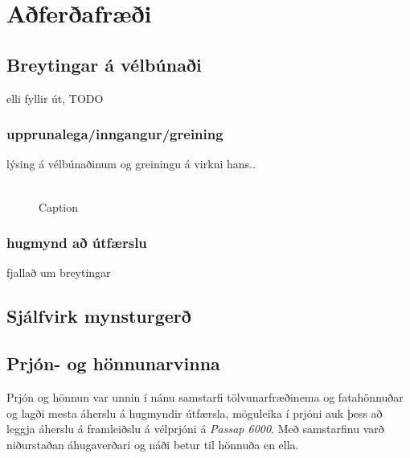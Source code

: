 \documentclass[a4paper,12pt,twoside]{article}
\begin{document}
\section{Aðferðafræði}\label{sec:adferdafraedi}
\subsection{Breytingar á vélbúnaði}
elli fyllir út, TODO
\subsubsection{upprunalega/inngangur/greining}
lýsing á vélbúnaðinum og greiningu á virkni hans.. \\\\
\begin{figure}[H]
    \centering
    \caption{Caption}
    \label{fig:enter-label}
\end{figure}

\subsubsection{hugmynd að útfærslu}
fjallað um breytingar
\subsection{Sjálfvirk mynsturgerð}

\subsection{Prjón- og hönnunarvinna}
Prjón og hönnun var unnin í nánu samstarfi tölvunarfræðinema og fatahönnuðar og lagði mesta áherslu á hugmyndir útfærsla, möguleika í prjóni auk þess að leggja áherslu á framleiðslu á vélprjóni á \textit{Passap 6000}. Með  samstarfinu varð niðurstaðan áhugaverðari og náði betur til hönnuða en ella. 
\end{document}
